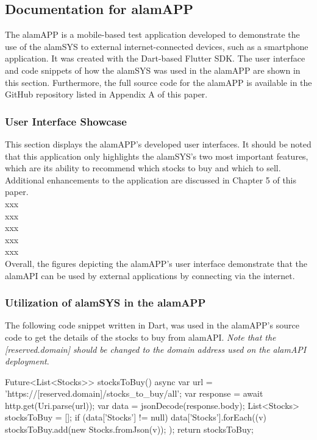 \subsection{Documentation for alamAPP}
\label{subsec:doc_alamAPP}
The alamAPP is a mobile-based test application developed to 
demonstrate the use of the alamSYS to external internet-connected 
devices, such as a smartphone application. It was created with the 
Dart-based Flutter SDK. The user interface and code snippets of how 
the alamSYS was used in the alamAPP are shown in this section. 
Furthermore, the full source code for the alamAPP is available 
in the GitHub repository listed in Appendix A of this paper.

\subsubsection{User Interface Showcase}
\label{subsubsec:alamAPP_UI}
This section displays the alamAPP's developed user interfaces. 
It should be noted that this application only highlights the 
alamSYS's two most important features, which are its ability 
to recommend which stocks to buy and which to sell. Additional 
enhancements to the application are discussed in Chapter 5 of 
this paper.
\\

xxx
\\

xxx
\\

xxx
\\

xxx
\\

xxx
\\

Overall, the figures depicting the alamAPP's user interface 
demonstrate that the alamAPI can be used by external applications 
by connecting via the internet.

\subsubsection{Utilization of alamSYS in the alamAPP}
\label{subsubsec:utilization_alamSYS-alamAPP}
The following code snippet written in Dart, was used in the alamAPP's source 
code to get the details of the stocks to buy from alamAPI.
\textit{Note that the [reserved.domain] should be changed to
the domain address used on the alamAPI deployment}.
\hfill \\
\begin{python}
    Future<List<Stocks>> stocksToBuy() async {
        var url = 'https://[reserved.domain]/stocks_to_buy/all';
        var response = await http.get(Uri.parse(url));
        var data = jsonDecode(response.body);
        List<Stocks> stocksToBuy = [];
        if (data['Stocks'] != null) {
        data['Stocks'].forEach((v) {
            stocksToBuy.add(new Stocks.fromJson(v));
        });
        }
        return stocksToBuy;
    }
\end{python}

